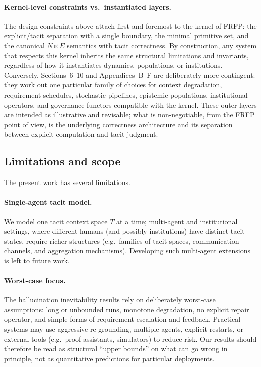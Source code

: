 \documentclass[11pt]{article}
\theoremstyle{definition}
\begin{document}
\paragraph{Kernel-level constraints vs.\ instantiated layers.}
The design constraints above attach first and foremost to the kernel of FRFP: the explicit/tacit separation with a single boundary, the minimal primitive set, and the canonical $N \ltimes E$ semantics with tacit correctness.
By construction, any system that respects this kernel inherits the same structural limitations and invariants, regardless of how it instantiates dynamics, populations, or institutions.
Conversely, Sections~6--10 and Appendices~B--F are deliberately more contingent: they work out one particular family of choices for context degradation, requirement schedules, stochastic pipelines, epistemic populations, institutional operators, and governance functors compatible with the kernel.
These outer layers are intended as illustrative and revisable; what is non-negotiable, from the FRFP point of view, is the underlying correctness architecture and its separation between explicit computation and tacit judgment.


\subsection{Limitations and scope}
\label{subsec:limitations}

The present work has several limitations.

\paragraph{Single-agent tacit model.}
We model one tacit context space $T$ at a time; multi-agent and institutional settings, where different humans (and possibly institutions) have distinct tacit states, require richer structures (e.g.\ families of tacit spaces, communication channels, and aggregation mechanisms). Developing such multi-agent extensions is left to future work.

\paragraph{Worst-case focus.}
The hallucination inevitability results rely on deliberately worst-case assumptions: long or unbounded runs, monotone degradation, no explicit repair operator, and simple forms of requirement escalation and feedback. Practical systems may use aggressive re-grounding, multiple agents, explicit restarts, or external tools (e.g.\ proof assistants, simulators) to reduce risk. Our results should therefore be read as structural ``upper bounds'' on what can go wrong in principle, not as quantitative predictions for particular deployments.
\end{document}
